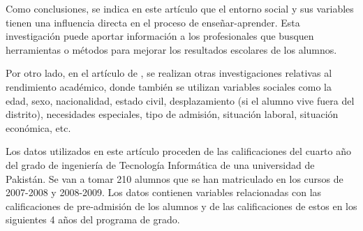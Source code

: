 Como conclusiones, se indica en este artículo que el entorno social y sus variables tienen una influencia directa en el proceso de enseñar-aprender. Esta investigación puede aportar información a los profesionales que busquen herramientas o métodos para mejorar los resultados escolares de los alumnos.

Por otro lado, en el artículo de , se realizan otras investigaciones relativas al rendimiento académico, donde también se utilizan variables sociales como la edad, sexo, nacionalidad, estado civil, desplazamiento (si el alumno vive fuera del distrito), necesidades especiales, tipo de admisión, situación laboral, situación económica, etc.

Los datos utilizados en este artículo proceden de las calificaciones del cuarto año del grado de ingeniería de Tecnología Informática de una universidad de Pakistán. Se van a tomar 210 alumnos que se han matriculado en los cursos de 2007-2008 y 2008-2009. Los datos contienen variables relacionadas con las calificaciones de pre-admisión de los alumnos y de las calificaciones de estos en los siguientes 4 años del programa de grado.

